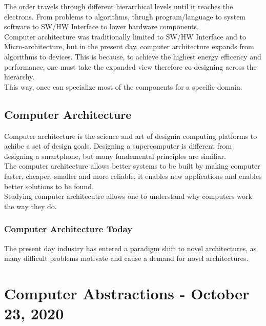 \documentclass[11pt,a4paper,twocolumn]{book}
\begin{document}
The order travels through different hierarchical levels until it reaches the electrons. From problems to algorithms, thrugh program/language to system software to SW/HW Interface to lower hardware components.\\

Computer architecture was traditionally limited to SW/HW Interface and to Micro-architecture, but in the present day, computer architecture expands from algorithms to devices. This is because, to achieve the highest energy efficency and performance, one must take the expanded view therefore co-designing across the hierarchy.\\

This way, once can specialize most of the components for a specific domain.

\section{Computer Architecture}

Computer architecture is the science and art of designin computing platforms to achibe a set of design goals. Designing a supercomputer is different from designing a smartphone, but many fundemental principles are similiar.\\

The computer architecture allows better systems to be built by making computer faster, cheaper, smaller and more reliable, it enables new applications and enables better solutions to be found.\\

Studying computer architecutre allows one to understand why computers work the way they do.

\subsection{Computer Architecture Today}

The present day industry has entered a paradigm shift to novel architectures, as many difficult problems motivate and cause a demand for novel architectures.



\chapter{Computer Abstractions - October 23, 2020}
\end{document}
